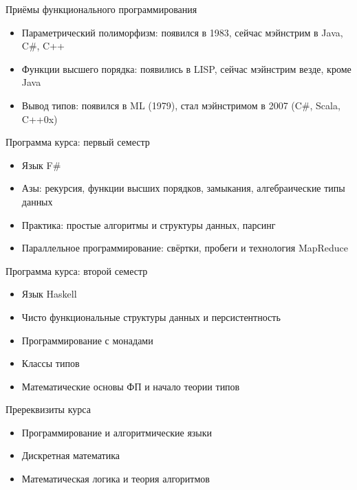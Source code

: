 \documentclass{beamer}
\begin{document}
\begin{frame}{Приёмы функционального программирования}
  \begin{itemize}
  \item Параметрический полиморфизм: появился в 1983, сейчас мэйнстрим в
    Java, C\#, C++\pause
  \item Функции высшего порядка: появились в LISP, сейчас мэйнстрим везде,
    кроме Java\pause
  \item Вывод типов: появился в ML (1979), стал мэйнстримом в 2007
    (C\#, Scala, C++0x)
  \end{itemize}
\end{frame}

\begin{frame}{Программа курса: первый семестр}
  \begin{itemize}
    \item Язык F\#\pause
    \item Азы: рекурсия, функции высших порядков, замыкания, алгебраические
      типы данных\pause
    \item Практика: простые алгоритмы и структуры данных, парсинг\pause
    \item Параллельное программирование: свёртки, пробеги и технология MapReduce
  \end{itemize}
\end{frame}

\begin{frame}{Программа курса: второй семестр}
  \begin{itemize}
    \item Язык Haskell\pause
    \item Чисто функциональные структуры данных и персистентность\pause
    \item Программирование с монадами\pause
    \item Классы типов\pause
    \item Математические основы ФП и начало теории типов
  \end{itemize}
\end{frame}

\begin{frame}{Пререквизиты курса}
  \begin{itemize}
  \item Программирование и алгоритмические языки
  \item Дискретная математика
  \item Математическая логика и теория алгоритмов
  \end{itemize}
\end{frame}
\end{document}
